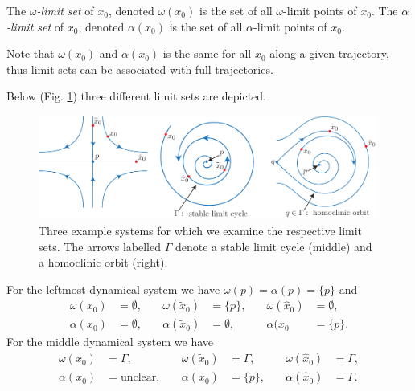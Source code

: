 \begin{definition}
	The \emph{$\omega $-limit set} of $x_0$, denoted $\omega(x_0)$ is the set of all $\omega$-limit points of $x_0$.
	The \emph{$\alpha $-limit set} of $x_0$, denoted $\alpha(x_0)$ is the set of all $\alpha$-limit points of $x_0$.
\end{definition}
\begin{remark}[]
	Note that $\omega(x_0)$ and $\alpha(x_0)$ is the same for all $x_0 $ along a given trajectory, thus limit sets can be associated with full trajectories.
\end{remark}
\begin{ex}
	Below (Fig. \ref{fig:limset_ex}) three different limit sets are depicted.
	\begin{figure}[h!]
		\centering
		\includegraphics[width=0.99\textwidth]{figures/ch4/6limset_ex.pdf}
		\caption{Three example systems for which we examine the respective limit sets. The arrows labelled $\Gamma $ denote a stable limit cycle (middle) and a homoclinic orbit (right).}
		\label{fig:limset_ex}
	\end{figure}
	For the leftmost dynamical system we have $\omega(p)=\alpha(p)=\{p\}$ and
	\begin{subequations}
\begin{align}
	\omega(x_0) &= \emptyset, \quad &\omega(\tilde{x}_0) &= \{p\}, \quad &{\omega }(\hat{x}_0)&= \emptyset, \\
	\alpha(x_0)&=\emptyset, \quad & \alpha(\tilde{x}_0)&=\emptyset,\quad &\alpha(\hat{x}_0&=\{p\}.
\end{align}
\end{subequations}
	For the middle dynamical system we have 
	\begin{subequations}
\begin{align}
	\omega(x_0) &= \Gamma, \quad &\omega(\tilde{x}_0) &= \Gamma, \quad &{\omega }(\hat{x}_0)&= \Gamma, \\
	\alpha(x_0)&= \textrm{unclear} , \quad & \alpha(\tilde{x}_0)&=\{p\},\quad &\alpha(\hat{x}_0)&=\Gamma.

\end{align}
\end{subequations}
\end{ex}
